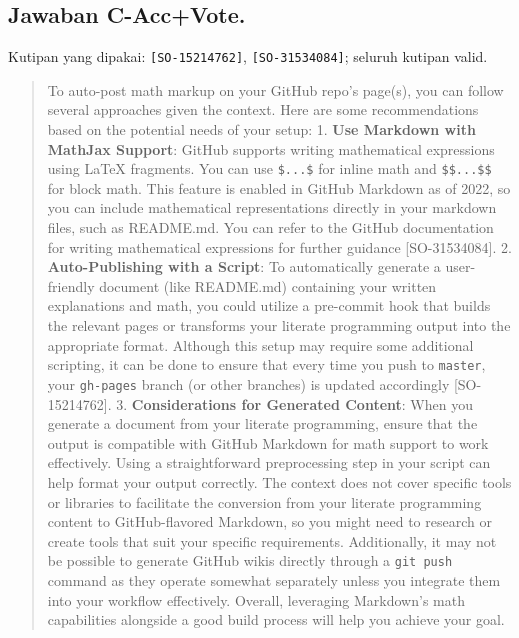 \subsection{Jawaban C-Acc+Vote.} Kutipan yang dipakai: \texttt{[SO-15214762]}, \texttt{[SO-31534084]}; seluruh kutipan valid.
\begin{quote}\small To auto-post math markup on your GitHub repo's page(s), you can follow several approaches given the context. Here are some recommendations based on the potential needs of your setup:  1. \textbf{Use Markdown with MathJax Support}: GitHub supports writing mathematical expressions using LaTeX fragments. You can use \texttt{\$.\allowbreak{}.\allowbreak{}.\allowbreak{}\$} for inline math and \texttt{\$\$.\allowbreak{}.\allowbreak{}.\allowbreak{}\$\$} for block math. This feature is enabled in GitHub Markdown as of 2022, so you can include mathematical representations directly in your markdown files, such as README.md. You can refer to the GitHub documentation for writing mathematical expressions for further guidance [SO-31534084].  2. \textbf{Auto-Publishing with a Script}: To automatically generate a user-friendly document (like README.md) containing your written explanations and math, you could utilize a pre-commit hook that builds the relevant pages or transforms your literate programming output into the appropriate format. Although this setup may require some additional scripting, it can be done to ensure that every time you push to \texttt{master}, your \texttt{gh-\allowbreak{}pages} branch (or other branches) is updated accordingly [SO-15214762].  3. \textbf{Considerations for Generated Content}: When you generate a document from your literate programming, ensure that the output is compatible with GitHub Markdown for math support to work effectively. Using a straightforward preprocessing step in your script can help format your output correctly.  The context does not cover specific tools or libraries to facilitate the conversion from your literate programming content to GitHub-flavored Markdown, so you might need to research or create tools that suit your specific requirements. Additionally, it may not be possible to generate GitHub wikis directly through a \texttt{git push} command as they operate somewhat separately unless you integrate them into your workflow effectively.   Overall, leveraging Markdown's math capabilities alongside a good build process will help you achieve your goal.\end{quote}


